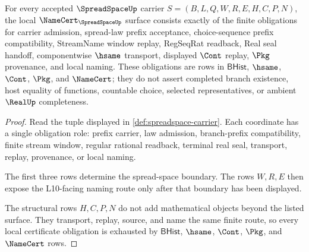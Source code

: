 \begin{theorem}
\label{thm:spreadspace-namecert-obligations}
For every accepted $\SpreadSpaceUp$ carrier $S=(B,L,Q,W,R,E,H,C,P,N)$, the local $\NameCert_{\SpreadSpaceUp}$ surface consists exactly of the finite obligations for carrier admission, spread-law prefix acceptance, choice-sequence prefix compatibility, StreamName window replay, RegSeqRat readback, Real seal handoff, componentwise $\hsame$ transport, displayed $\Cont$ replay, $\Pkg$ provenance, and local naming. These obligations are rows in $\mathsf{BHist}$, $\hsame$, $\Cont$, $\Pkg$, and $\NameCert$; they do not assert completed branch existence, host equality of functions, countable choice, selected representatives, or ambient $\RealUp$ completeness.
\end{theorem}
\begin{proof}
Read the tuple displayed in \autoref{def:spreadspace-carrier}. Each coordinate has a single obligation role: prefix carrier, law admission, branch-prefix compatibility, finite stream window, regular rational readback, terminal real seal, transport, replay, provenance, or local naming.

The first three rows determine the spread-space boundary. The rows $W,R,E$ then expose the L10-facing naming route only after that boundary has been displayed.

The structural rows $H,C,P,N$ do not add mathematical objects beyond the listed surface. They transport, replay, source, and name the same finite route, so every local certificate obligation is exhausted by $\mathsf{BHist}$, $\hsame$, $\Cont$, $\Pkg$, and $\NameCert$ rows.
\end{proof}

